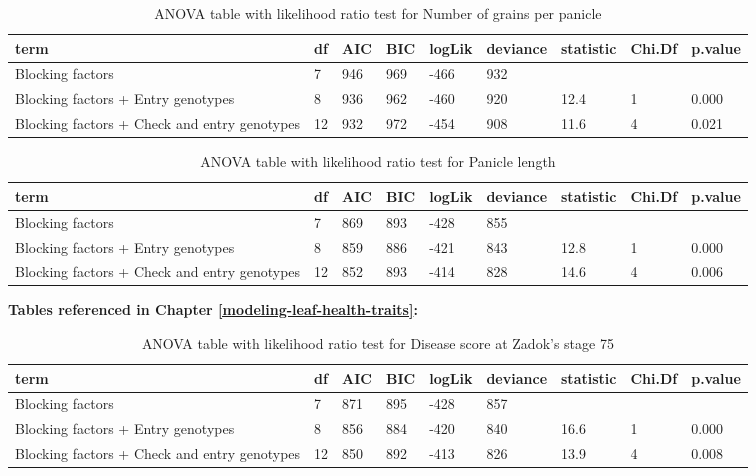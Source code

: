 \documentclass[12pt,oneside]{dukestatscithesis} %
\begin{document}
\begin{table}[H]

\caption{\label{tab:unnamed-chunk-3}\label{tab:lrt-gperpan}ANOVA table with likelihood ratio test for Number of grains per panicle}
\centering
\begin{tabular}[t]{>{\raggedright\arraybackslash}p{3.5cm}llllllll}
\toprule
term & df & AIC & BIC & logLik & deviance & statistic & Chi.Df & p.value\\
\midrule
Blocking factors & 7 & 946 & 969 & -466 & 932 &  &  & \\
Blocking factors + Entry genotypes & 8 & 936 & 962 & -460 & 920 & 12.4 & 1 & 0.000\\
Blocking factors + Check and entry genotypes & 12 & 932 & 972 & -454 & 908 & 11.6 & 4 & 0.021\\
\bottomrule
\end{tabular}
\end{table}
\begin{table}[H]

\caption{\label{tab:unnamed-chunk-3}\label{tab:lrt-panlen}ANOVA table with likelihood ratio test for Panicle length}
\centering
\begin{tabular}[t]{>{\raggedright\arraybackslash}p{3.5cm}llllllll}
\toprule
term & df & AIC & BIC & logLik & deviance & statistic & Chi.Df & p.value\\
\midrule
Blocking factors & 7 & 869 & 893 & -428 & 855 &  &  & \\
Blocking factors + Entry genotypes & 8 & 859 & 886 & -421 & 843 & 12.8 & 1 & 0.000\\
Blocking factors + Check and entry genotypes & 12 & 852 & 893 & -414 & 828 & 14.6 & 4 & 0.006\\
\bottomrule
\end{tabular}
\end{table}
\textbf{Tables referenced in Chapter \ref{modeling-leaf-health-traits}:}
\begin{table}[H]

\caption{\label{tab:unnamed-chunk-4}\label{tab:lrt-dis-score}ANOVA table with likelihood ratio test for Disease score at Zadok's stage 75}
\centering
\begin{tabular}[t]{>{\raggedright\arraybackslash}p{3.5cm}llllllll}
\toprule
term & df & AIC & BIC & logLik & deviance & statistic & Chi.Df & p.value\\
\midrule
Blocking factors & 7 & 871 & 895 & -428 & 857 &  &  & \\
Blocking factors + Entry genotypes & 8 & 856 & 884 & -420 & 840 & 16.6 & 1 & 0.000\\
Blocking factors + Check and entry genotypes & 12 & 850 & 892 & -413 & 826 & 13.9 & 4 & 0.008\\
\bottomrule
\end{tabular}
\end{table}
\end{document}
